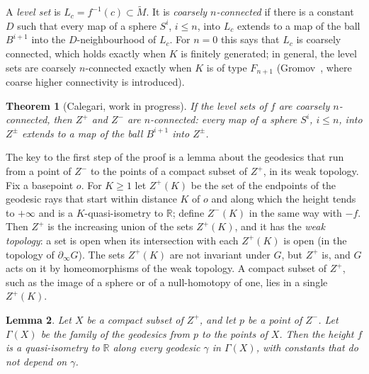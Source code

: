 \documentclass[11pt]{article}
\newtheorem{theorem}{Theorem}[section]
\newtheorem{lemma}[theorem]{Lemma}
\theoremstyle{remark}
\newcommand{\R}{\mathbb{R}}
\begin{document}
A \emph{level set} is $L_c=f^{-1}(c)\subset\widetilde M$. It is \emph{coarsely $n$-connected} if there is a constant $D$
such that every map of a sphere $S^i$, $i\le n$, into $L_c$ extends to a map of the ball $B^{i+1}$ into the
$D$-neighbourhood of $L_c$. For $n=0$ this says that $L_c$ is coarsely connected, which holds exactly when $K$ is finitely
generated; in general, the level sets are coarsely $n$-connected exactly when $K$ is of type $F_{n+1}$ (Gromov~\cite{G},
where coarse higher connectivity is introduced).

\begin{theorem}[Calegari, work in progress]\label{thm:conn}
If the level sets of $f$ are coarsely $n$-connected, then $Z^+$ and $Z^-$ are $n$-connected: every map of a sphere $S^i$,
$i\le n$, into $Z^\pm$ extends to a map of the ball $B^{i+1}$ into $Z^\pm$.
\end{theorem}

The key to the first step of the proof is a lemma about the geodesics that run from a point of $Z^-$ to the points of
a compact subset of $Z^+$, in its weak topology. Fix a basepoint $o$. For $K\ge1$ let $Z^+(K)$ be the set of the endpoints
of the geodesic rays that start within distance $K$ of $o$ and along which the height tends to $+\infty$ and is a
$K$-quasi-isometry to $\R$; define $Z^-(K)$ in the same way with $-f$. Then $Z^+$ is the increasing union of the sets
$Z^+(K)$, and it has the \emph{weak topology}: a set is open when its intersection with each $Z^+(K)$ is open (in the
topology of $\partial_\infty G$). The sets $Z^+(K)$ are not invariant under $G$, but $Z^+$ is, and $G$ acts on it by
homeomorphisms of the weak topology. A compact subset of $Z^+$, such as the image of a sphere or of a null-homotopy of
one, lies in a single $Z^+(K)$.

\begin{lemma}\label{lem:geod}
Let $X$ be a compact subset of $Z^+$, and let $p$ be a point of $Z^-$. Let $\Gamma(X)$ be the family of the geodesics from $p$
to the points of $X$. Then the height $f$ is a quasi-isometry to $\R$ along every geodesic $\gamma$ in $\Gamma(X)$, with
constants that do not depend on $\gamma$.
\end{lemma}
\end{document}
